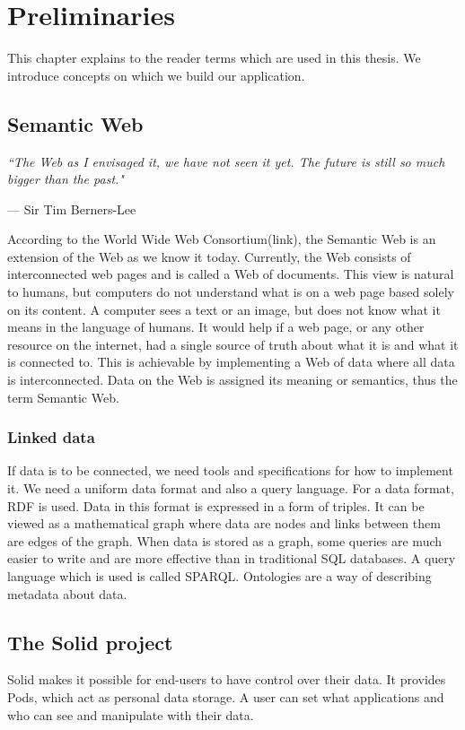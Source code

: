 \setlength{\epigraphwidth}{.5\textwidth}
\setlength\epigraphrule{0pt}

\chapter{Preliminaries}
This chapter explains to the reader terms which are used in this thesis.
We introduce concepts on which we build our application.

\section{Semantic Web}
\epigraph{\textit{``The Web as I envisaged it, we have not seen it yet. The future is still so much bigger than the past."}}{--- Sir Tim Berners-Lee}

According to the World Wide Web Consortium(link), the Semantic Web is an extension of the Web as we know it today.
Currently, the Web consists of interconnected web pages and is called a Web of documents.
This view is natural to humans, but computers do not understand what is on a web page based solely on its content. 
A computer sees a text or an image, but does not know what it means in the language of humans.
It would help if a web page, or any other resource on the internet, had a single source of truth about what it is and what it is connected to.
This is achievable by implementing a Web of data where all data is interconnected.
Data on the Web is assigned its meaning or semantics, thus the term Semantic Web.

\subsection*{Linked data}
If data is to be connected, we need tools and specifications for how to implement it.
We need a uniform data format and also a query language.
For a data format, RDF is used.
Data in this format is expressed in a form of triples.
It can be viewed as a mathematical graph where data are nodes and links between them are edges of the graph.
When data is stored as a graph, some queries are much easier to write and are more effective than in traditional SQL databases.
A query language which is used is called SPARQL.
Ontologies are a way of describing metadata about data.


\section{The Solid project}
Solid makes it possible for end-users to have control over their data.
It provides Pods, which act as personal data storage.
A user can set what applications and who can see and manipulate with their data.
